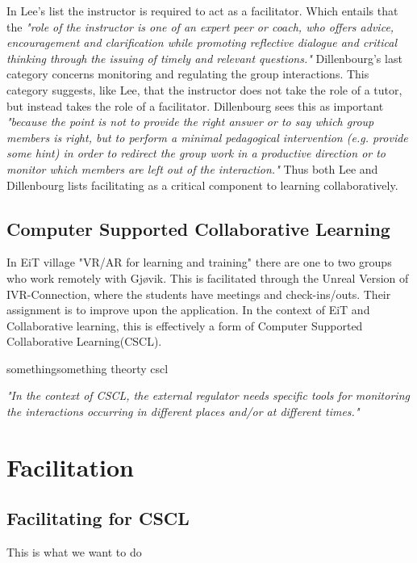         In Lee's list the instructor is required to act as a facilitator. Which entails that the \emph{"role of the instructor is one of an expert peer or coach, who offers advice, encouragement and clarification while promoting reflective dialogue and critical thinking through the issuing of timely and relevant questions."} \cite{Lee2009} Dillenbourg's last category concerns monitoring and regulating the group interactions. This category suggests, like Lee, that the instructor does not take the role of a tutor, but instead takes the role of a facilitator. Dillenbourg sees this as important \emph{"because the point is not to provide the right answer or to say which group members is right, but to perform a minimal pedagogical intervention (e.g. provide some hint) in order to redirect the group work in a productive direction or to monitor which members are left out of the interaction."} \cite{dillenbourg1999} Thus both Lee and Dillenbourg lists facilitating as a critical component to learning collaboratively.
        
        \subsection{Computer Supported Collaborative Learning}
        In EiT village "VR/AR for learning and training" there are one to two groups who work remotely with Gjøvik. This is facilitated through the Unreal Version of IVR-Connection, where the students have meetings and check-ins/outs. Their assignment is to improve upon the application. In the context of EiT and Collaborative learning, this is effectively a form of Computer Supported Collaborative Learning(CSCL).
        
        somethingsomething theorty cscl
        
        
        \emph{"In the context of CSCL, the external regulator needs specific tools for monitoring the interactions occurring in different places and/or at different times."} \cite{dillenbourg1999}

    
    \section{Facilitation}
    
        \subsection{Facilitating for CSCL}
        This is what we want to do